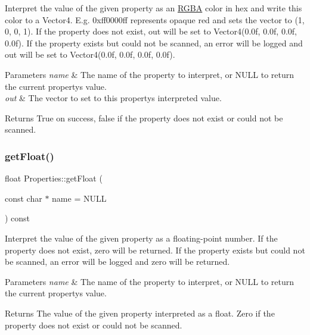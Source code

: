 Interpret the value of the given property as an \hyperlink{structRGBA}{R\+G\+BA} color in hex and write this color to a Vector4. E.\+g. 0xff0000ff represents opaque red and sets the vector to (1, 0, 0, 1). If the property does not exist, out will be set to Vector4(0.\+0f, 0.\+0f, 0.\+0f, 0.\+0f). If the property exists but could not be scanned, an error will be logged and out will be set to Vector4(0.\+0f, 0.\+0f, 0.\+0f, 0.\+0f).


\begin{DoxyParams}{Parameters}
{\em name} & The name of the property to interpret, or N\+U\+LL to return the current property\textquotesingle{}s value. \\
\hline
{\em out} & The vector to set to this property\textquotesingle{}s interpreted value.\\
\hline
\end{DoxyParams}
\begin{DoxyReturn}{Returns}
True on success, false if the property does not exist or could not be scanned. 
\end{DoxyReturn}
\mbox{\label{classProperties_a4ed868ff9fe81bee289e2e9f5670dbc1}} 
\subsubsection{\texorpdfstring{get\+Float()}{getFloat()}\hspace{0.1cm}{\footnotesize\ttfamily [1/2]}}
{\footnotesize\ttfamily float Properties\+::get\+Float (\begin{DoxyParamCaption}\item[{const char $\ast$}]{name = {\ttfamily NULL} }\end{DoxyParamCaption}) const}

Interpret the value of the given property as a floating-\/point number. If the property does not exist, zero will be returned. If the property exists but could not be scanned, an error will be logged and zero will be returned.


\begin{DoxyParams}{Parameters}
{\em name} & The name of the property to interpret, or N\+U\+LL to return the current property\textquotesingle{}s value.\\
\hline
\end{DoxyParams}
\begin{DoxyReturn}{Returns}
The value of the given property interpreted as a float. Zero if the property does not exist or could not be scanned. 
\end{DoxyReturn}
\mbox{\label{classProperties_a4ed868ff9fe81bee289e2e9f5670dbc1}} 
